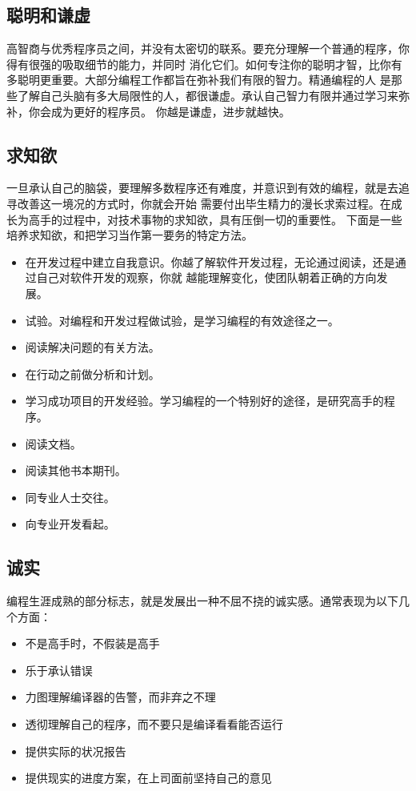 \documentclass{article}
\begin{document}
\subsection{聪明和谦虚}
高智商与优秀程序员之间，并没有太密切的联系。要充分理解一个普通的程序，你得有很强的吸取细节的能力，并同时
消化它们。如何专注你的聪明才智，比你有多聪明更重要。大部分编程工作都旨在弥补我们有限的智力。精通编程的人
是那些了解自己头脑有多大局限性的人，都很谦虚。承认自己智力有限并通过学习来弥补，你会成为更好的程序员。
你越是谦虚，进步就越快。

\subsection{求知欲}
一旦承认自己的脑袋，要理解多数程序还有难度，并意识到有效的编程，就是去追寻改善这一境况的方式时，你就会开始
需要付出毕生精力的漫长求索过程。在成长为高手的过程中，对技术事物的求知欲，具有压倒一切的重要性。
下面是一些培养求知欲，和把学习当作第一要务的特定方法。
\begin{itemize}
    \item 在开发过程中建立自我意识。你越了解软件开发过程，无论通过阅读，还是通过自己对软件开发的观察，你就
    越能理解变化，使团队朝着正确的方向发展。
    \item 试验。对编程和开发过程做试验，是学习编程的有效途径之一。
    \item 阅读解决问题的有关方法。
    \item 在行动之前做分析和计划。
    \item 学习成功项目的开发经验。学习编程的一个特别好的途径，是研究高手的程序。
    \item 阅读文档。
    \item 阅读其他书本期刊。
    \item 同专业人士交往。
    \item 向专业开发看起。
\end{itemize}

\subsection{诚实}
编程生涯成熟的部分标志，就是发展出一种不屈不挠的诚实感。通常表现为以下几个方面：
\begin{itemize}
    \item 不是高手时，不假装是高手
    \item 乐于承认错误
    \item 力图理解编译器的告警，而非弃之不理
    \item 透彻理解自己的程序，而不要只是编译看看能否运行
    \item 提供实际的状况报告
    \item 提供现实的进度方案，在上司面前坚持自己的意见
\end{itemize}
\end{document}
